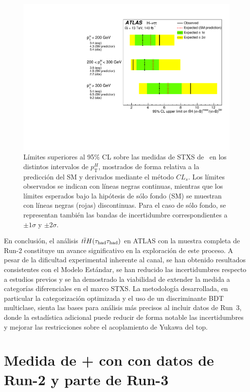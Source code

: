 \begin{figure}[h]
  \centering
  \includegraphics[width=0.70\linewidth]{images/fit_stxs/fig_08.pdf} %
  \caption{Límites superiores al 95\% CL sobre las medidas de STXS de \ttH\ en los distintos intervalos de $p_{\mathrm{T}}^{H}$, mostrados de forma relativa a la predicción del SM y derivados mediante el método $CL_s$. Los límites observados se indican con líneas negras continuas, mientras que los límites esperados bajo la hipótesis de sólo fondo (SM) se muestran con líneas negras (rojas) discontinuas. Para el caso de sólo fondo, se representan también las bandas de incertidumbre correspondientes a $\pm 1\sigma$ y $\pm 2\sigma$.}
  \label{res:tth_cls_limits}
\end{figure}

En conclusión, el análisis \(t\overline{t}H(\tau_{\mathrm{had}}\tau_{\mathrm{had}})\) en ATLAS con la muestra completa de Run-2 constituye un avance significativo en la exploración de este proceso. A pesar de la dificultad experimental inherente al canal, se han obtenido resultados consistentes con el Modelo Estándar, se han reducido las incertidumbres respecto a estudios previos y se ha demostrado la viabilidad de extender la medida a categorías diferenciales en el marco STXS. La metodología desarrollada, en particular la categorización optimizada y el uso de un discriminante BDT multiclase, sienta las bases para análisis más precisos al incluir datos de Run~3, donde la estadística adicional puede reducir de forma notable las incertidumbres y mejorar las restricciones sobre el acoplamiento de Yukawa del top.

\FloatBarrier


\section*{Medida de \thqb + \ttH con \htautau con datos de Run-2 y parte de Run-3}


